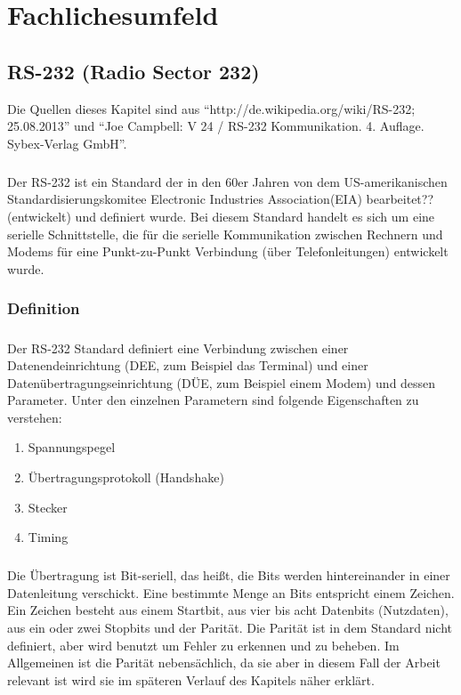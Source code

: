 \chapter{Fachlichesumfeld}\label{chp:fachlichesumfeld}

\section{RS-232 (Radio Sector 232)}

Die Quellen dieses Kapitel sind aus "`http://de.wikipedia.org/wiki/RS-232; 25.08.2013"' und "`Joe Campbell: V 24 / RS-232 Kommunikation. 4. Auflage. Sybex-Verlag GmbH"'.

\paragraph{}
Der RS-232 ist ein Standard der in den 60er Jahren von dem US-amerikanischen Standardisierungskomitee Electronic Industries Association(EIA) bearbeitet?? (entwickelt) und definiert wurde. Bei diesem Standard handelt es sich um eine serielle Schnittstelle, die für die serielle Kommunikation zwischen Rechnern und Modems für eine Punkt-zu-Punkt Verbindung (über Telefonleitungen) entwickelt wurde.


\subsection{Definition}
\paragraph{}

Der RS-232 Standard definiert eine Verbindung zwischen einer Datenendeinrichtung (DEE, zum Beispiel das Terminal) und einer Datenübertragungseinrichtung (DÜE, zum Beispiel einem Modem) und dessen Parameter. Unter den einzelnen Parametern sind folgende Eigenschaften zu verstehen:
\begin{enumerate}
\item Spannungspegel
\item Übertragungsprotokoll (Handshake)
\item Stecker
\item Timing
\end{enumerate}

\paragraph{}
Die Übertragung ist Bit-seriell, das heißt, die Bits werden hintereinander in einer Datenleitung verschickt. Eine bestimmte Menge an Bits entspricht einem Zeichen. Ein Zeichen besteht aus einem Startbit, aus vier bis acht Datenbits (Nutzdaten), aus ein oder zwei Stopbits und der Parität. Die Parität ist in dem Standard nicht definiert, aber wird benutzt um Fehler zu erkennen und zu beheben. Im Allgemeinen ist die Parität nebensächlich, da sie aber in diesem Fall der Arbeit relevant ist wird sie im späteren Verlauf des Kapitels näher erklärt.


